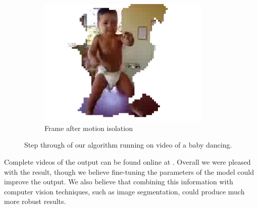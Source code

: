 \begin{figure}[tb]
\begin{subfigure}[b]{0.33\textwidth}
		\includegraphics[width=0.9\textwidth]{figs/bimbodance-image50.png}
		\caption{Frame after motion isolation}
	\end{subfigure}%

	\caption{Step through of our algorithm running on video of a baby dancing.}
	\label{fig:bimbodance}
\end{figure}

Complete videos of the output can be found online at .
Overall we were pleased with the result, though we believe fine-tuning the
parameters of the model could improve the output.  We also believe that
combining this information with computer vision techniques, such as image
segmentation, could produce much more robust results.





